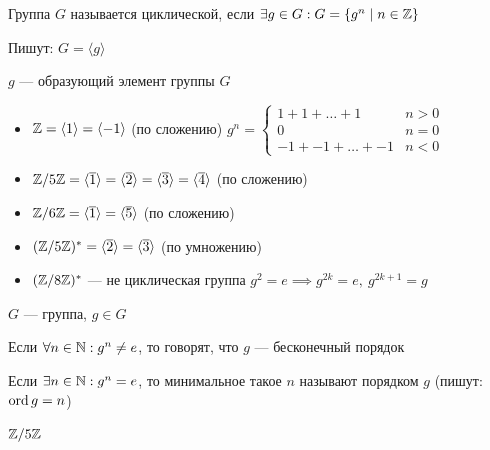 \begin{normalsize}
\begin{defn}
    Группа $G$ называется циклической, если $\exists g \in G : G = \{g^n \mid n \in \mathbb{Z}\}$

    Пишут: $G = \langle g \rangle$
\end{defn}

\begin{defn}
    $g$ --- образующий элемент группы $G$
\end{defn}

\begin{examples}
    \begin{itemize}
        \item $\mathbb{Z} = \langle 1 \rangle = \langle -1 \rangle$ (по сложению) $g^n = \begin{cases}
            1 + 1 + \ldots + 1 & n > 0 \\
            0 & n = 0 \\
            -1 + -1 + \ldots + -1 & n < 0
        \end{cases}$

        \item $\mathbb{Z}/5\mathbb{Z} = \langle \overline{1} \rangle = \langle \overline{2} \rangle = \langle \overline{3} \rangle = \langle \overline{4} \rangle$ (по сложению)
        
        \item $\mathbb{Z}/6\mathbb{Z} = \langle \overline{1} \rangle = \langle \overline{5} \rangle$ (по сложению)
        
        \item $(\mathbb{Z}/5\mathbb{Z})^* = \langle \overline{2} \rangle = \langle \overline{3} \rangle$ (по умножению)
        
        \item $(\mathbb{Z}/8\mathbb{Z})^*$ --- не циклическая группа $g^2 = e \implies g^{2k} = e,~g^{2k+1} = g$
    \end{itemize}
\end{examples}

\begin{defn}
    $G$ --- группа, $g \in G$

    Если $\forall n \in \mathbb{N}: g^n \neq e$, то говорят, что $g$ --- бесконечный порядок

    Если $\exists n \in \mathbb{N}: g^n = e$, то минимальное такое $n$ называют порядком $g$ (пишут: $\operatorname{ord} g = n$)
\end{defn}

\begin{example}
    $\mathbb{Z}/5\mathbb{Z}$


\end{example}
\end{normalsize}

